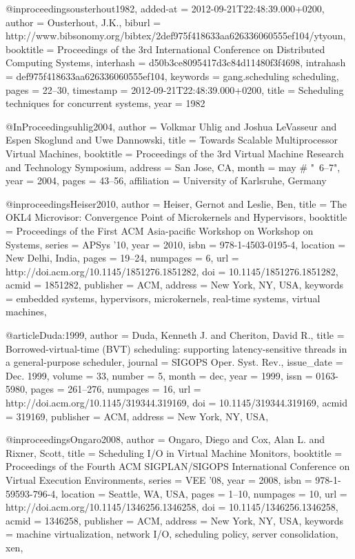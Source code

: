 @inproceedings{ousterhout1982,
  added-at = {2012-09-21T22:48:39.000+0200},
  author = {Ousterhout, J.K.},
  biburl = {http://www.bibsonomy.org/bibtex/2def975f418633aa626336060555ef104/ytyoun},
  booktitle = {Proceedings of the 3rd International Conference on Distributed Computing Systems},
  interhash = {d50b3ce8095417d3c84d11480f3f4698},
  intrahash = {def975f418633aa626336060555ef104},
  keywords = {gang.scheduling scheduling},
  pages = {22--30},
  timestamp = {2012-09-21T22:48:39.000+0200},
  title = {Scheduling techniques for concurrent systems},
  year = 1982
}

@InProceedings{uhlig2004,
    author = {Volkmar Uhlig and Joshua LeVasseur and Espen Skoglund and Uwe Dannowski},
    title = {Towards Scalable Multiprocessor Virtual Machines},
    booktitle = {Proceedings of the 3rd Virtual Machine Research and Technology Symposium},
    address = {San Jose, CA},
    month = may # "~6--7",
    year = 2004,
    pages = {43--56},
    affiliation = {University of Karlsruhe, Germany}
}

@inproceedings{Heiser2010,
 author = {Heiser, Gernot and Leslie, Ben},
 title = {The OKL4 Microvisor: Convergence Point of Microkernels and Hypervisors},
 booktitle = {Proceedings of the First ACM Asia-pacific Workshop on Workshop on Systems},
 series = {APSys '10},
 year = {2010},
 isbn = {978-1-4503-0195-4},
 location = {New Delhi, India},
 pages = {19--24},
 numpages = {6},
 url = {http://doi.acm.org/10.1145/1851276.1851282},
 doi = {10.1145/1851276.1851282},
 acmid = {1851282},
 publisher = {ACM},
 address = {New York, NY, USA},
 keywords = {embedded systems, hypervisors, microkernels, real-time systems, virtual machines},
} 

@article{Duda:1999,
 author = {Duda, Kenneth J. and Cheriton, David R.},
 title = {Borrowed-virtual-time (BVT) scheduling: supporting latency-sensitive threads in a general-purpose scheduler},
 journal = {SIGOPS Oper. Syst. Rev.},
 issue_date = {Dec. 1999},
 volume = {33},
 number = {5},
 month = dec,
 year = {1999},
 issn = {0163-5980},
 pages = {261--276},
 numpages = {16},
 url = {http://doi.acm.org/10.1145/319344.319169},
 doi = {10.1145/319344.319169},
 acmid = {319169},
 publisher = {ACM},
 address = {New York, NY, USA},
} 

@inproceedings{Ongaro2008,
 author = {Ongaro, Diego and Cox, Alan L. and Rixner, Scott},
 title = {Scheduling I/O in Virtual Machine Monitors},
 booktitle = {Proceedings of the Fourth ACM SIGPLAN/SIGOPS International Conference on Virtual Execution Environments},
 series = {VEE '08},
 year = {2008},
 isbn = {978-1-59593-796-4},
 location = {Seattle, WA, USA},
 pages = {1--10},
 numpages = {10},
 url = {http://doi.acm.org/10.1145/1346256.1346258},
 doi = {10.1145/1346256.1346258},
 acmid = {1346258},
 publisher = {ACM},
 address = {New York, NY, USA},
 keywords = {machine virtualization, network I/O, scheduling policy, server consolidation, xen},
} 


